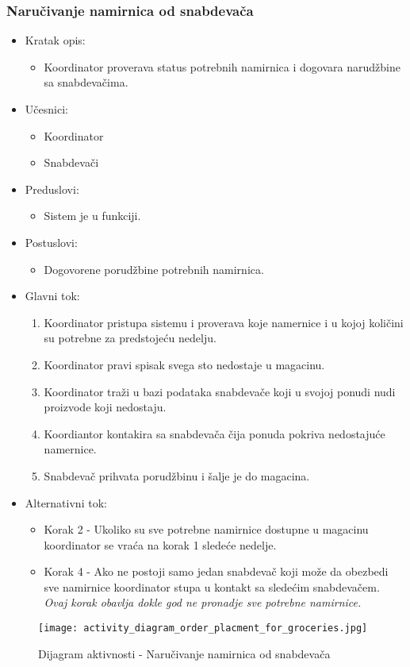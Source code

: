 

\subsubsection{Naručivanje namirnica od snabdevača}


\begin{itemize}
	\item Kratak opis:
		\begin{itemize}
			\item Koordinator proverava status potrebnih namirnica i dogovara narudžbine sa snabdevačima.
		\end{itemize}
	\item Učesnici:
		\begin{itemize}
		    \item Koordinator
		    \item Snabdevači
		\end{itemize}
	\item Preduslovi:
		\begin{itemize}
		   
		    \item Sistem je u funkciji.
		\end{itemize}
	\item Postuslovi:
		\begin{itemize}
			\item Dogovorene porudžbine potrebnih namirnica. 
	\end{itemize}
	\item Glavni tok:
		\begin{enumerate}
            \item	Koordinator pristupa sistemu i proverava koje namernice i u kojoj količini su potrebne za predstojeću nedelju.
           \item Koordinator pravi spisak svega sto nedostaje u magacinu.
            \item Koordinator traži u bazi podataka snabdevače koji u svojoj ponudi nudi proizvode koji nedostaju.
             \item  Koordiantor kontakira sa snabdevača čija ponuda pokriva nedostajuće namernice.
            \item Snabdevač prihvata porudžbinu i šalje je do magacina.
		\end{enumerate}
	\item Alternativni tok:
		\begin{itemize}
		    \item Korak 2 - Ukoliko su sve potrebne namirnice dostupne u magacinu koordinator se vraća na korak 1 sledeće nedelje.
		    \item Korak 4 - Ako ne postoji samo jedan snabdevač koji može da obezbedi sve namirnice koordinator stupa u kontakt sa sledećim snabdevačem. \textit{Ovaj korak obavlja dokle god ne pronadje sve potrebne namirnice.}
		\end{itemize}
\end{itemize}

\begin{figure}[H]
\begin{center}
\texttt{[image: activity\_diagram\_order\_placment\_for\_groceries.jpg]}
\end{center}
    \caption{Dijagram aktivnosti - Naručivanje namirnica od snabdevača}
\label{fig:Activity_diagram_order_placment_for_groceries}
\end{figure}
